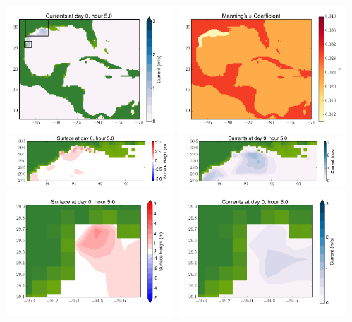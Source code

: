 \documentclass[11pt]{article}
\begin{document}
\includegraphics[width=0.475\textwidth]{frame0077fig2.png}
\vskip 10pt 
\includegraphics[width=0.475\textwidth]{frame0077fig3.png}
\includegraphics[width=0.475\textwidth]{frame0077fig4.png}
\vskip 10pt 
\includegraphics[width=0.475\textwidth]{frame0077fig5.png}
\includegraphics[width=0.475\textwidth]{frame0077fig6.png}
\vskip 10pt 
\includegraphics[width=0.475\textwidth]{frame0077fig7.png}
\end{document}
